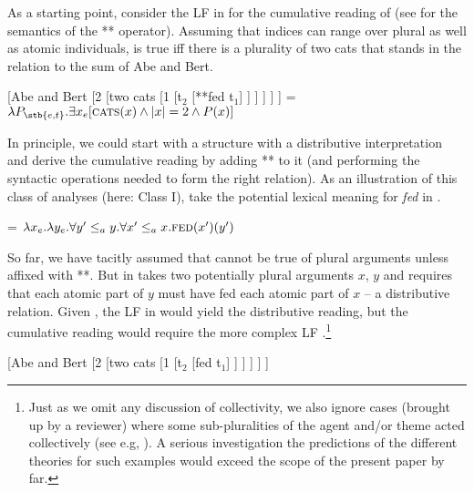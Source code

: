 \documentclass[output=paper]{langscibook}
\begin{document}
As a starting point, consider the LF in  for the cumulative reading of  (see  for the semantics of the ** operator). Assuming that indices can range over plural as well as atomic individuals,  is true iff there is a plurality of two cats that stands in the relation  to the sum of Abe and Bert.

\ea 
\ea \label{has-sch:12a} {[Abe and Bert [2 [two cats [1 [t$_2$ [**fed t$_1$] ] ] ] ] ]} 
\ex \label{has-sch:12b}  = $\lambda P_{\stb{e, t}}.\exists x_e[\textsc{cats}(x) \land |x| = 2 \land P(x)]$ \z\z

\noindent In principle, we could start with a structure with a distributive interpretation and derive the cumulative reading by adding ** to it (and performing the syntactic operations needed to form the right relation). As an illustration of this class of analyses (here: Class I), take the potential lexical meaning for \textit{fed} in .


\ea \label{has-sch:13b}  = $\lambda x_e.\lambda y_e.\forall y' \leq_a y.\forall x' \leq_a x.\textsc{fed}(x')(y')$ \z

\noindent So far, we have tacitly assumed that  cannot be true of plural arguments unless affixed with **. But    in  takes two potentially plural arguments $x$, $y$ and requires that each atomic part of $y$ must have fed each atomic part of $x$ -- a distributive relation. Given , the LF in  would yield the distributive reading, but the cumulative reading would require the more complex LF .\footnote{Just as we omit any discussion of collectivity, we also ignore cases (brought up by a reviewer) where some sub-pluralities of the agent and/or theme acted collectively (see e.g, \citealt{Does:1992, Landman:2000, Vaillette:2001, Champollion:2017}). A serious investigation the predictions of the different theories for such examples would exceed the scope of the present paper by far.}


\ea \label{has-sch:13a} {[Abe and Bert [2 [two cats [1 [t$_2$ [fed t$_1$] ] ] ] ] ]}  \z
\end{document}

